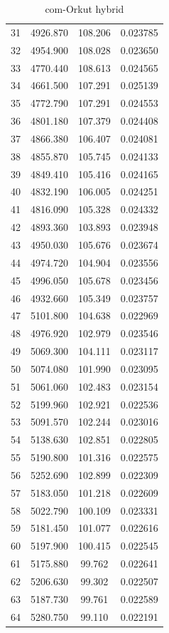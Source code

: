 \documentclass[10pt,twocolumn,letterpaper]{article}
\begin{document}
\begin{table}[h]
\begin{tabular}{@{}c|ccc@{}}
31 & 4926.870 & 108.206 & 0.023785 \\
32 & 4954.900 & 108.028 & 0.023650 \\
33 & 4770.440 & 108.613 & 0.024565 \\
34 & 4661.500 & 107.291 & 0.025139 \\
35 & 4772.790 & 107.291 & 0.024553 \\
36 & 4801.180 & 107.379 & 0.024408 \\
37 & 4866.380 & 106.407 & 0.024081 \\
38 & 4855.870 & 105.745 & 0.024133 \\
39 & 4849.410 & 105.416 & 0.024165 \\
40 & 4832.190 & 106.005 & 0.024251 \\
41 & 4816.090 & 105.328 & 0.024332 \\
42 & 4893.360 & 103.893 & 0.023948 \\
43 & 4950.030 & 105.676 & 0.023674 \\
44 & 4974.720 & 104.904 & 0.023556 \\
45 & 4996.050 & 105.678 & 0.023456 \\
46 & 4932.660 & 105.349 & 0.023757 \\
47 & 5101.800 & 104.638 & 0.022969 \\
48 & 4976.920 & 102.979 & 0.023546 \\
49 & 5069.300 & 104.111 & 0.023117 \\
50 & 5074.080 & 101.990 & 0.023095 \\
51 & 5061.060 & 102.483 & 0.023154 \\
52 & 5199.960 & 102.921 & 0.022536 \\
53 & 5091.570 & 102.244 & 0.023016 \\
54 & 5138.630 & 102.851 & 0.022805 \\
55 & 5190.800 & 101.316 & 0.022575 \\
56 & 5252.690 & 102.899 & 0.022309 \\
57 & 5183.050 & 101.218 & 0.022609 \\
58 & 5022.790 & 100.109 & 0.023331 \\
59 & 5181.450 & 101.077 & 0.022616 \\
60 & 5197.900 & 100.415 & 0.022545 \\
61 & 5175.880 & 99.762 & 0.022641 \\
62 & 5206.630 & 99.302 & 0.022507 \\
63 & 5187.730 & 99.761 & 0.022589 \\
64 & 5280.750 & 99.110 & 0.022191 \\
\bottomrule
\end{tabular}
\caption{com-Orkut hybrid}
\end{table}
\end{document}
